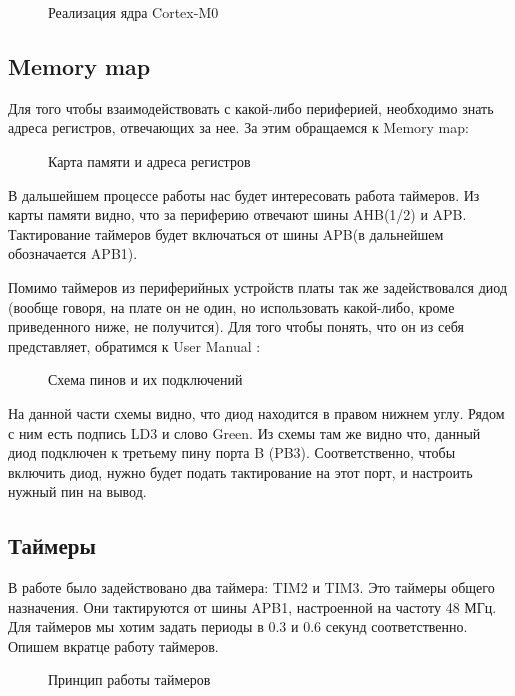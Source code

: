 \begin{figure}[H]
    \caption{Реализация ядра Cortex-M0}
\end{figure}

\subsection{Memory map}
Для того чтобы взаимодействовать с какой-либо периферией, необходимо знать адреса регистров, отвечающих за нее. За этим
обращаемся к Memory map:

\begin{figure}[H]
    \caption{Карта памяти и адреса регистров}
\end{figure}

В дальшейшем процессе работы нас будет интересовать работа таймеров. Из карты памяти видно, что за периферию отвечают шины 
AHB(1/2) и APB. Тактирование таймеров будет включаться от шины APB(в дальнейшем обозначается APB1).

Помимо таймеров из периферийных устройств платы так же задействовался диод (вообще говоря, на плате он не один, но
использовать какой-либо, кроме приведенного ниже, не получится). Для того чтобы понять, что он из себя представляет, обратимся
к User Manual \cite{user}:

\begin{figure}[H]
    \caption{Схема пинов и их подключений}
\end{figure}

На данной части схемы видно, что диод находится в правом нижнем углу. Рядом с ним есть подпись LD3 и слово Green. 
Из схемы там же видно что, данный диод подключен к третьему пину порта B (PB3). Соответственно, чтобы включить диод,
нужно будет подать тактирование на этот порт, и настроить нужный пин на вывод.

\subsection{Таймеры}
В работе было задействовано два таймера: TIM2 и TIM3. Это таймеры общего назначения. Они тактируются от шины APB1, 
настроенной на частоту 48 МГц. Для таймеров мы хотим задать периоды в $0.3$ и $0.6$ секунд соответственно.
Опишем вкратце работу таймеров.

\begin{figure}[H]
\centering
    \caption{Принцип работы таймеров}
\end{figure}

